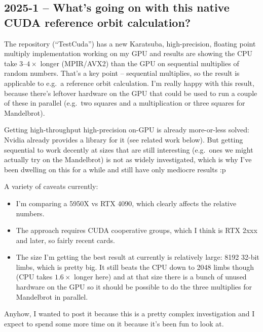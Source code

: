 \subsection{2025-1 -- What's going on with this native CUDA reference orbit calculation?}

The repository (``TestCuda'') has a new Karatsuba, high-precision, floating 
point multiply implementation working on my GPU and results are showing the CPU 
take $3$--$4\times$ longer (MPIR/AVX2) than the GPU on sequential multiplies of 
random numbers.  That's a key point -- sequential multiplies, so the result is 
applicable to e.g.\ a reference orbit calculation.  I'm really happy with this 
result, because there's leftover hardware on the GPU that could be used to run 
a couple of these in parallel (e.g.\ two squares and a multiplication or three 
squares for Mandelbrot).

Getting high-throughput high-precision on-GPU is already more-or-less solved:  
Nvidia already provides a library for it (see related work below).  But getting 
sequential to work decently at sizes that are still interesting (e.g.\ ones we 
might actually try on the Mandelbrot) is not as widely investigated, which is 
why I've been dwelling on this for a while and still have only mediocre results 
:p

A variety of caveats currently:

\begin{itemize}

\item I'm comparing a 5950X vs RTX 4090, which clearly affects the relative 
numbers.

\item The approach requires CUDA cooperative groups, which I think is RTX 2xxx 
and later, so fairly recent cards.

\item The size I'm getting the best result at currently is relatively large: 
8192 32-bit limbs, which is pretty big.  It still beats the CPU down to 2048 
limbs though (CPU takes $1.6\times$ longer here) and at that size there is a 
bunch of unused hardware on the GPU so it should be possible to do the three 
multiplies for Mandelbrot in parallel.

\end{itemize}

Anyhow, I wanted to post it because this is a pretty complex investigation and 
I expect to spend some more time on it because it's been fun to look at.

